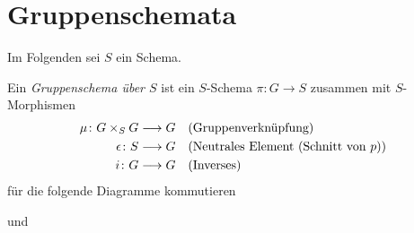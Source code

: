 \documentclass[german]{scrreprt}
\begin{document}
\chapter{Gruppenschemata}
Im Folgenden sei $S$ ein Schema.
\begin{Definition}[$S$"=Gruppenschema]
  Ein \emph{Gruppenschema über $S$} ist ein
  $S$-Schema $\pi\colon G\to S$ zusammen mit $S$-Morphismen
  \begin{align*}
    \mu\colon G\times_S G &\longrightarrow G
    &&\text{(Gruppenverknüpfung)}\\
    \epsilon\colon S&\longrightarrow G 
    &&\text{(Neutrales Element (Schnitt von $p$))}\\
    i\colon G &\longrightarrow G    
    &&\text{(Inverses)}
  \end{align*}
  für die folgende Diagramme kommutieren
  \begin{description}[labelwidth=4cm]
  \item[Neutrales Element]
    und
  \item[Inverses]

\end{description}
\end{Definition}
\end{document}
